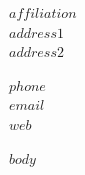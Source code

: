 \documentclass[11pt,letterpaper,oneside]{article}
\date{}
\begin{document}
\thispagestyle{empty}


\begin{minipage}[t]{3.5in} 
  \flushright 
  \footnotesize {$affiliation$} \\
  \footnotesize {$address1$} \\
  \footnotesize {$address2$} 
\end{minipage}
\hfill     
\hfill
\begin{minipage}[t]{2in}
  \flushright 
  \footnotesize {$phone$} \, \faPhone \\
  {\footnotesize {\href{mailto:$email$}{$email$}} \, \faEnvelope} \\
  {\footnotesize {\href{https://www.$web$}{$web$}} \, \faGlobe}
\end{minipage}

\vspace{3em}

\reversemarginpar

\vspace{1em}

$body$
	
\end{document}
